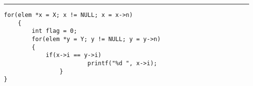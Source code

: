 \vspace{5pt} \hrule
\begin{lstlisting}[caption={Итератор пересечения множеств}, label=p_46, escapechar=\%]
for(elem *x = X; x != NULL; x = x->n)
	{
		int flag = 0;
		for(elem *y = Y; y != NULL; y = y->n)
		{
			if(x->i == y->i)
	                	printf("%d ", x->i);
                }
}
\end{lstlisting}
